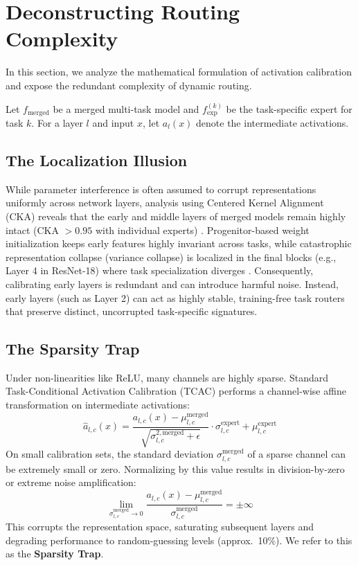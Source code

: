 \documentclass{article}
\theoremstyle{plain}
\theoremstyle{definition}
\theoremstyle{remark}
\begin{document}
\section{Deconstructing Routing Complexity}
In this section, we analyze the mathematical formulation of activation calibration and expose the redundant complexity of dynamic routing.

Let $f_{\text{merged}}$ be a merged multi-task model and $f_{\text{exp}}^{(k)}$ be the task-specific expert for task $k$. For a layer $l$ and input $x$, let $a_l(x)$ denote the intermediate activations.

\subsection{The Localization Illusion}
While parameter interference is often assumed to corrupt representations uniformly across network layers, analysis using Centered Kernel Alignment (CKA) reveals that the early and middle layers of merged models remain highly intact (CKA $> 0.95$ with individual experts) \cite{Authors2026a}. Progenitor-based weight initialization keeps early features highly invariant across tasks, while catastrophic representation collapse (variance collapse) is localized in the final blocks (e.g., Layer 4 in ResNet-18) where task specialization diverges \cite{Jordan2022}. Consequently, calibrating early layers is redundant and can introduce harmful noise. Instead, early layers (such as Layer 2) can act as highly stable, training-free task routers that preserve distinct, uncorrupted task-specific signatures.

\subsection{The Sparsity Trap}
Under non-linearities like ReLU, many channels are highly sparse. Standard Task-Conditional Activation Calibration (TCAC) performs a channel-wise affine transformation on intermediate activations:
\begin{equation}
\hat{a}_{l,c}(x) = \frac{a_{l,c}(x) - \mu_{l,c}^{\text{merged}}}{\sqrt{\sigma_{l,c}^{2,\text{merged}} + \epsilon}} \cdot \sigma_{l,c}^{\text{expert}} + \mu_{l,c}^{\text{expert}}
\end{equation}
On small calibration sets, the standard deviation $\sigma_{l,c}^{\text{merged}}$ of a sparse channel can be extremely small or zero. Normalizing by this value results in division-by-zero or extreme noise amplification:
\begin{equation}
\lim_{\sigma_{l,c}^{\text{merged}} \to 0} \frac{a_{l,c}(x) - \mu_{l,c}^{\text{merged}}}{\sigma_{l,c}^{\text{merged}}} = \pm \infty
\end{equation}
This corrupts the representation space, saturating subsequent layers and degrading performance to random-guessing levels (approx.\ 10\%). We refer to this as the \textbf{Sparsity Trap}. 
\end{document}
